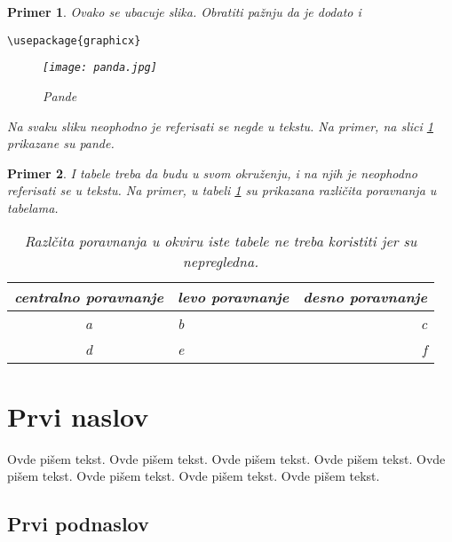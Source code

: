 \documentclass[a4paper]{article}
\newtheorem{primer}{Primer}[section]
\begin{document}
\begin{primer} Ovako se ubacuje slika. Obratiti pažnju da je dodato i 
\begin{verbatim}
\usepackage{graphicx}
\end{verbatim}

\begin{figure}[h!]
\begin{center}
\texttt{[image: panda.jpg]}
\end{center}
\caption{Pande}
\label{fig:pande}
\end{figure}

Na svaku sliku neophodno je referisati se negde u tekstu. Na primer, na slici \ref{fig:pande} prikazane su pande. 
\end{primer}

\begin{primer} I tabele treba da budu u svom okruženju, i na njih je neophodno referisati se u tekstu. Na primer, u tabeli \ref{tab:tabela1} su prikazana različita poravnanja u tabelama.

\begin{table}[h!]
\begin{center}
\caption{Razlčita poravnanja u okviru iste tabele ne treba koristiti jer su nepregledna.}
\begin{tabular}{|c|l|r|} \hline
centralno poravnanje& levo poravnanje& desno poravnanje\\ \hline
a &b&c\\ \hline
d &e&f\\ \hline
\end{tabular}
\label{tab:tabela1}
\end{center}
\end{table}

\end{primer}





\section{Prvi naslov}
\label{sec:naslov1}


Ovde pišem tekst. 
Ovde pišem tekst. 
Ovde pišem tekst. 
Ovde pišem tekst. 
Ovde pišem tekst. 
Ovde pišem tekst. 
Ovde pišem tekst. 
Ovde pišem tekst. 


\subsection{Prvi podnaslov}
\label{subsec:podnaslov1}
\end{document}
